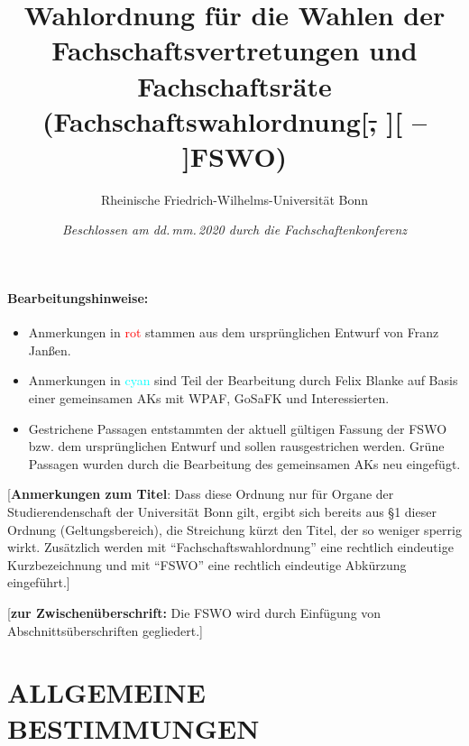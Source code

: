 \documentclass[%
draft,%
multilinesections%
]{fswo}
\newcommand\oldT[1]  {{\color{Gray}[\st{#1}]}}
\newcommand\newT[1]  {{\color{Green}[#1]}}
\newcommand\bemFr[1] {{\color{Red}[#1]}}
\newcommand\oldT[1]{}%
\newcommand\newT[1]{#1}
\newcommand\bemFr[1]{}%
\newcommand\change[2]{\oldT{#1}\newT{#2}}
\begin{document}
\title{Wahlordnung für die Wahlen der Fachschaftsvertretungen und Fachschaftsräte\\
(Fachschaftswahlordnung\change{, }{ -- }FSWO)}
\subtitle{Rheinische Friedrich-Wilhelms-Universität Bonn}
\author{}
\date{{\itshape\normalsize%
  Beschlossen am dd.\,mm.\,2020 durch die Fachschaftenkonferenz}}
\publishers{\itshape\normalsize%
  sowie am dd.\,mm.\,2020 durch das Studierendenparlament.}

\maketitle

\makeatletter
\ifFK@draft
\paragraph{Bearbeitungshinweise:}
\begin{itemize}
\item Anmerkungen in \textcolor{Red}{rot} stammen aus dem ursprünglichen Entwurf von Franz Janßen.
\item Anmerkungen in \textcolor{Cyan}{cyan} sind Teil der Bearbeitung durch Felix Blanke auf Basis einer gemeinsamen AKs mit WPAF, GoSaFK und Interessierten.
\item Gestrichene Passagen entstammten der aktuell gültigen Fassung der FSWO bzw. dem ursprünglichen Entwurf und sollen rausgestrichen werden. Grüne Passagen wurden durch die Bearbeitung des gemeinsamen AKs neu eingefügt.
\end{itemize}
\fi
\makeatother

\bemFr{\textbf{Anmerkungen zum Titel}: Dass diese Ordnung nur für Organe der Studierendenschaft der Universität Bonn gilt, ergibt sich bereits aus \S 1 dieser Ordnung (Geltungsbereich), die Streichung kürzt den Titel, der so weniger sperrig wirkt. Zusätzlich werden mit \enquote{Fachschaftswahlordnung} eine rechtlich eindeutige Kurzbezeichnung und mit \enquote{FSWO} eine rechtlich eindeutige Abkürzung eingeführt.}
%
\begingroup
\endgroup


\bemFr{\textbf{zur Zwischenüberschrift:} Die FSWO wird durch Einfügung von Abschnittsüberschriften gegliedert.}
\section{ALLGEMEINE BESTIMMUNGEN}
\end{document}
